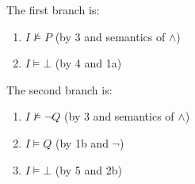 \begin{exer}[1.1]
\begin{enumerate}[label=(\alph*)]
            The first branch is:
            \begin{enumerate}[label=\arabic*a.]
                \item %
                    $I \not\models P$ (by 3 and semantics of $\land$)
                \item %
                    $I \models \bot$ (by 4 and 1a)
            \end{enumerate}

            The second branch is:
            \begin{enumerate}[label=\arabic*b.]
                \item %
                    $I \not\models \neg Q$ (by 3 and semantics of $\land$)
                \item %
                    $I \models Q$ (by 1b and $\neg$)
                \item %
                    $I \models \bot$ (by 5 and 2b)
            \end{enumerate}


\end{enumerate}
\end{exer}
